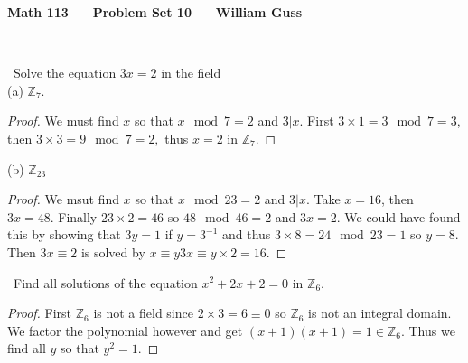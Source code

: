 \documentclass[11pt]{amsart}
\begin{document}
\begin{center}{\bf Math 113 --- Problem Set 10 --- William Guss} \end{center}


\bigskip


\medskip {}\
\medskip {}\

\medskip {}\ Solve the equation $3x =2$ in the field\\
(a) $\mathbb{Z}_7$.
\begin{proof}	
	We must find $x$ so that $x \mod 7 = 2$ and $3 | x$.
	First $3\times 1 = 3 \mod 7 = 3$, then $3 \times 3 = 9 \mod 7 = 2,$ thus $x = 2$ in $\mathbb{Z}_7.$
\end{proof}
(b) $\mathbb{Z}_23$
\begin{proof}
	We msut find $x$ so that $x \mod 23 = 2$ and $3 | x$.
	Take $x = 16$, then $3x = 48.$ Finally $23\times 2 = 46$ so $48 \mod 46 = 2$ and $3x = 2.$ We could have found this by showing that $3y = 1 $ if $y = 3^{-1}$ and thus $3\times 8 = 24 \mod 23 = 1$ so $y = 8$.
	Then $3x \equiv 2$ is solved by $x \equiv y3x  \equiv y \times 2 = 16.$ 
\end{proof}
\medskip {}\ Find all solutions of the equation $x^2 + 2x + 2= 0$ in $\mathbb{Z}_6.$
\begin{proof}
	First $\mathbb{Z}_6$ is not a field since $2 \times 3 = 6 \equiv 0$ so $\mathbb{Z}_6$ is not an integral domain. We factor the polynomial however and get
	$(x+1)(x+1) = 1 \in \mathbb{Z}_6.$ Thus we find all $y$ so that $y^2 = 1.$
\end{proof}
\medskip {}\
\end{document}

